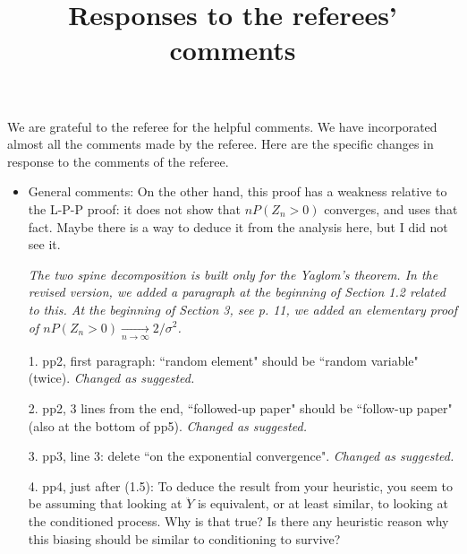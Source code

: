 \documentclass[12pt,a4paper]{amsart}
\title[Responses]{\large Responses to the referees' comments}
\numberwithin{equation}{section}
\begin{document}
\maketitle	
	We are grateful to the referee for the helpful comments.
	We have incorporated almost all the comments made by the referee.
	Here are the specific changes in response to the comments of the referee.
\\
\begin{itemize}
\item
	General comments: On the other hand, this proof has a weakness relative to the L-P-P proof: it does not show that $n P(Z_n > 0)$ converges, and uses that fact.
	Maybe there is a way to deduce it from the analysis here, but I did not see it.
	
	{\it 
  The two spine decomposition is built only for the Yaglom's theorem.
	In the revised version, we added a paragraph at the beginning of Section 1.2 related to this.
   At the beginning of Section 3, see p. 11,  we added an elementary proof of $n P(Z_n > 0) \xrightarrow[n\to \infty]{} 2/ \sigma^2$.
  }
\\	
\item[1.]
	pp2, first paragraph: ``random element" should be ``random variable" (twice).
	{\it Changed as suggested.}
\\	
\item[2.]
	pp2, 3 lines from the end, ``followed-up paper" should be ``follow-up paper" (also at the bottom of pp5).
	{\it Changed as suggested.}
\\
\item[3.]
	pp3, line 3: delete ``on the exponential convergence".
	{\it Changed as suggested.}
\\
\item[4.]
	pp4, just after (1.5): To deduce the result from your heuristic, you seem to be assuming that looking at $\ddot Y$ is equivalent, or at least similar, to looking at the conditioned process.
	Why is that true?
	Is there any heuristic reason why this biasing should be similar to conditioning to survive?
	

\end{itemize}
\end{document}
